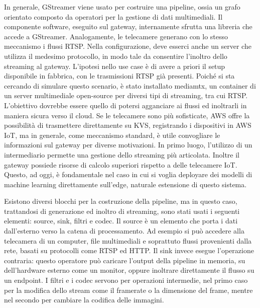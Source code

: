 In generale, GStreamer viene usato per costruire una pipeline, ossia un grafo orientato composto da operatori per la gestione di dati multimediali. Il componente software, eseguito sul gateway, internamente sfrutta una libreria che accede a GStreamer. %
Analogamente, le telecamere generano con lo stesso meccanismo i flussi RTSP. Nella configurazione, deve esserci anche un server che utilizza il medesimo protocollo, in modo tale da consentire l'inoltro dello streaming al gateway. L'ipotesi nello use case è di avere a priori il setup disponibile in fabbrica, con le trasmissioni RTSP già presenti. Poiché si sta cercando di simulare questo scenario, è stato installato mediamtx, un container di un server multimediale open-source per diversi tipi di streaming, tra cui RTSP. L'obiettivo dovrebbe essere quello di potersi agganciare ai flussi ed inoltrarli in maniera sicura verso il cloud. Se le telecamere sono più sofisticate, AWS offre la possibilità di trasmettere direttamente su KVS, registrando i dispositivi in AWS IoT, ma in generale, come meccanismo standard, è utile convogliare le informazioni sul gateway per diverse motivazioni. In primo luogo, l'utilizzo di un intermediario permette una gestione dello streaming più articolata. Inoltre il gateway possiede risorse di calcolo superiori rispetto a delle telecamere IoT. Questo, ad oggi, è fondamentale nel caso in cui si voglia deployare dei modelli di machine learning direttamente sull'edge, naturale estensione di questo sistema.

Esistono diversi blocchi per la costruzione della pipeline, ma in questo caso, trattandosi di generazione ed inoltro di streaming, sono stati usati i seguenti elementi: source, sink, filtri e codec. Il source è un elemento che porta i dati dall'esterno verso la catena di processamento. Ad esempio si può accedere alla telecamera di un computer, file multimediali e soprattuto flussi provenienti dalla rete, basati su protocolli come RTSP ed HTTP. Il sink invece esegue l'operazione contraria: questo operatore può caricare l'output della pipeline in memoria, su dell'hardware esterno come un monitor, oppure inoltrare direttamente il flusso su un endpoint. I filtri e i codec servono per operazioni intermedie, nel primo caso per la modifica dello stream come il framerate o la dimensione del frame, mentre nel secondo per cambiare la codifica delle immagini. 


